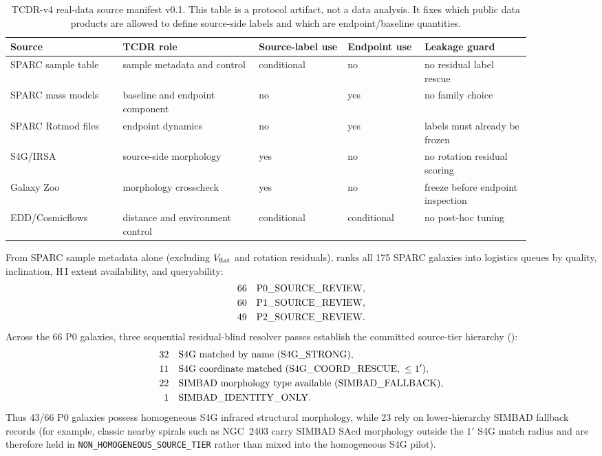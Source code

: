 \documentclass[11pt]{article}
\begin{document}
\begin{table}[htbp]
\centering
\scriptsize
\setlength{\tabcolsep}{3pt}
\begin{tabular}{L{0.19\linewidth}L{0.23\linewidth}L{0.15\linewidth}L{0.13\linewidth}L{0.18\linewidth}}
\toprule
Source & TCDR role & Source-label use & Endpoint use & Leakage guard\\
\midrule
SPARC sample table & sample metadata and control & conditional & no & no residual label rescue\\
SPARC mass models & baseline and endpoint component & no & yes & no family choice\\
SPARC Rotmod files & endpoint dynamics & no & yes & labels must already be frozen\\
S4G/IRSA & source-side morphology & yes & no & no rotation residual scoring\\
Galaxy Zoo & morphology crosscheck & yes & no & freeze before endpoint inspection\\
EDD/Cosmicflows & distance and environment control & conditional & conditional & no post-hoc tuning\\
\bottomrule
\end{tabular}
\caption{TCDR-v4 real-data source manifest v0.1.  This table is a protocol
artifact, not a data analysis.  It fixes which public data products are allowed
to define source-side labels and which are endpoint/baseline quantities.}
\label{tab:real-data-manifest}
\end{table}

From SPARC sample metadata alone (excluding \(V_{\rm flat}\) and rotation
residuals),  ranks all
175 SPARC galaxies into logistics queues by quality, inclination, H\,I extent
availability, and queryability:
\begin{align*}
  66 &\quad {\rm P0\_SOURCE\_REVIEW},\\
  60 &\quad {\rm P1\_SOURCE\_REVIEW},\\
  49 &\quad {\rm P2\_SOURCE\_REVIEW}.
\end{align*}
Across the 66 P0 galaxies, three sequential residual-blind resolver passes
establish the committed source-tier hierarchy
():
\begin{align*}
  32 &\quad {\rm S4G\ matched\ by\ name}\ ({\rm S4G\_STRONG}),\\
  11 &\quad {\rm S4G\ coordinate\ matched}\ ({\rm S4G\_COORD\_RESCUE},\ \le 1'),\\
  22 &\quad {\rm SIMBAD\ morphology\ type\ available}\ ({\rm SIMBAD\_FALLBACK}),\\
   1 &\quad {\rm SIMBAD\_IDENTITY\_ONLY}.
\end{align*}
Thus 43/66 P0 galaxies possess homogeneous S4G infrared structural morphology,
while 23 rely on lower-hierarchy SIMBAD fallback records (for example, classic
nearby spirals such as NGC~2403 carry SIMBAD \(\mathrm{SAcd}\) morphology
outside the \(1'\) S4G match radius and are therefore held in
\texttt{NON\_HOMOGENEOUS\_SOURCE\_TIER} rather than mixed into the homogeneous
S4G pilot).
\end{document}
